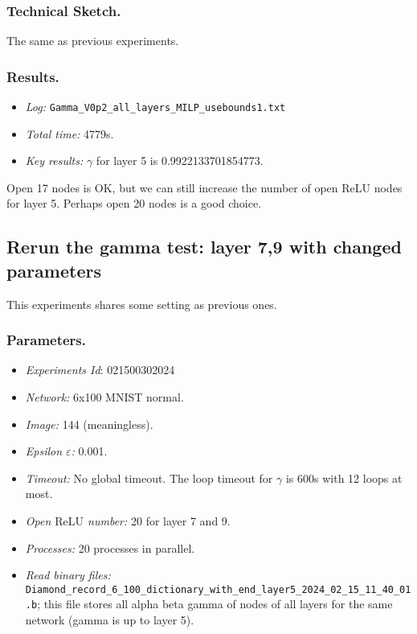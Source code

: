 \documentclass{llncs}
\newcommand{\ReLU}{\mathrm{ReLU}}
\begin{document}
\subsubsection*{Technical Sketch.}

The same as previous experiments.

\subsubsection*{Results.}

\begin{itemize}
	\item \emph{Log:} \verb*|Gamma_V0p2_all_layers_MILP_usebounds1.txt|

	\item \emph{Total time:} 4779s.

	\item \emph{Key results:} $\gamma$ for layer 5 is 0.9922133701854773.
\end{itemize}


Open 17 nodes is OK, but we can still increase the number of open ReLU nodes for layer 5. Perhaps open 20 nodes is a good choice.



\subsection{Rerun the gamma test: layer 7,9 with changed parameters}

This experiments shares some setting as previous ones. 

\subsubsection*{Parameters.}

\begin{itemize}
	\item\emph{Experiments Id}: 021500302024
	
	\item\emph{Network:} 6x100 MNIST normal. 
	
	\item\emph{Image:} 144 (meaningless).
	
	\item\emph{Epsilon $\varepsilon$:} 0.001.
	
	\item\emph{Timeout:} No global timeout. The loop timeout for $\gamma$ is 600s with 12 loops at most.
	
	\item\emph{Open $\ReLU$ number:} 20 for layer 7 and 9. 
	
	\item\emph{Processes:} 20 processes in parallel.
	
	\item\emph{Read binary files:} \verb*|Diamond_record_6_100_dictionary_with_end_layer5_2024_02_15_11_40_01.b|; this file stores all alpha beta gamma of nodes of all layers for the same network (gamma is up to layer 5). 
\end{itemize}
\end{document}
